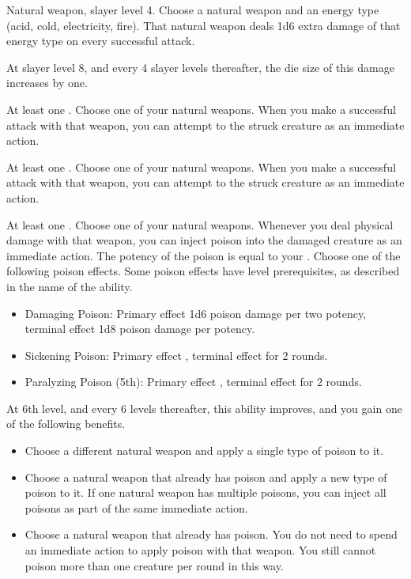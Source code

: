     \featpre Natural weapon, slayer level 4.
    \featben Choose a natural weapon and an energy type (acid, cold, electricity, fire).
    That natural weapon deals 1d6 extra damage of that energy type on every successful attack.

    At slayer level 8, and every 4 slayer levels thereafter, the die size of this damage increases by one.

    \featpre At least one .
    \featben Choose one of your natural weapons.
    When you make a successful attack with that weapon, you can attempt to  the struck creature as an immediate action.

    \featpre At least one .
    \featben Choose one of your natural weapons.
    When you make a successful attack with that weapon, you can attempt to  the struck creature as an immediate action.

    \featpre At least one .
    \featben Choose one of your natural weapons.
    Whenever you deal physical damage with that weapon, you can inject poison into the damaged creature as an immediate action.
    The potency of the poison is equal to your .
    Choose one of the following poison effects.
    Some poison effects have level prerequisites, as described in the name of the ability.
    \begin{itemize}
        \item Damaging Poison: Primary effect 1d6 poison damage per two potency, terminal effect 1d8 poison damage per potency.
        \item Sickening Poison: Primary effect \sickened, terminal effect \nauseated for 2 rounds.
        \item Paralyzing Poison (5th): Primary effect \immobilized, terminal effect \paralyzed for 2 rounds.
    \end{itemize}

    At 6th level, and every 6 levels thereafter, this ability improves, and you gain one of the following benefits.
    \begin{itemize}
        \item Choose a different natural weapon and apply a single type of poison to it.
        \item Choose a natural weapon that already has poison and apply a new type of poison to it.
            If one natural weapon has multiple poisons, you can inject all poisons as part of the same immediate action.
        \item Choose a natural weapon that already has poison.
            You do not need to spend an immediate action to apply poison with that weapon.
            You still cannot poison more than one creature per round in this way.
    \end{itemize}

